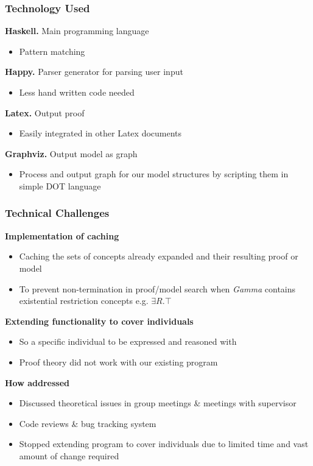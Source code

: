 \begin{frame}
  \frametitle{Technology Used}
\textbf{Haskell.} Main programming language
\begin{itemize}
\item Pattern matching
\end{itemize}
\smallskip
\textbf{Happy.} Parser generator for parsing user input
\begin{itemize}
\item Less hand written code needed
\end{itemize}
\smallskip
\textbf{Latex.} Output proof
\begin{itemize}
\item Easily integrated in other Latex documents
\end{itemize}
\smallskip
\textbf{Graphviz.} Output model as graph
\begin{itemize}
\item Process and output graph for our model structures by scripting them in simple DOT language
\end{itemize}
 \end{frame}

\begin{frame}
  \frametitle{Technical Challenges}
\textbf{Implementation of caching}
\begin{itemize}
\item Caching the sets of concepts already expanded and their resulting proof or model
\item To prevent non-termination in proof/model search when \textit{Gamma} contains existential restriction concepts e.g. $\exists R . \top$
\end{itemize}

\textbf{Extending functionality to cover individuals}
\begin{itemize}
\item So a specific individual to be expressed and reasoned with
\item Proof theory did not work with our existing program
\end{itemize}

\textbf{How addressed}
\begin{itemize}
\item Discussed theoretical issues in group meetings \& meetings with supervisor
\item Code reviews \& bug tracking system
\item Stopped extending program to cover individuals due to limited time and vast amount of change required
\end{itemize}
 \end{frame}

